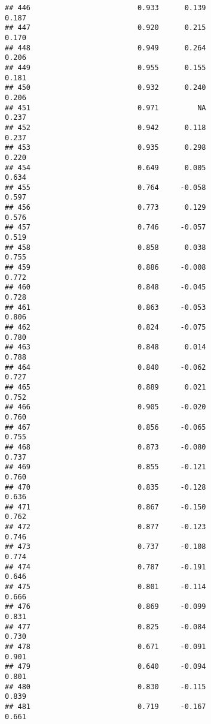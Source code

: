 \documentclass[
]{article}
\begin{document}
\begin{verbatim}
## 446                         0.933      0.139                     0.187
## 447                         0.920      0.215                     0.170
## 448                         0.949      0.264                     0.206
## 449                         0.955      0.155                     0.181
## 450                         0.932      0.240                     0.206
## 451                         0.971         NA                     0.237
## 452                         0.942      0.118                     0.237
## 453                         0.935      0.298                     0.220
## 454                         0.649      0.005                     0.634
## 455                         0.764     -0.058                     0.597
## 456                         0.773      0.129                     0.576
## 457                         0.746     -0.057                     0.519
## 458                         0.858      0.038                     0.755
## 459                         0.886     -0.008                     0.772
## 460                         0.848     -0.045                     0.728
## 461                         0.863     -0.053                     0.806
## 462                         0.824     -0.075                     0.780
## 463                         0.848      0.014                     0.788
## 464                         0.840     -0.062                     0.727
## 465                         0.889      0.021                     0.752
## 466                         0.905     -0.020                     0.760
## 467                         0.856     -0.065                     0.755
## 468                         0.873     -0.080                     0.737
## 469                         0.855     -0.121                     0.760
## 470                         0.835     -0.128                     0.636
## 471                         0.867     -0.150                     0.762
## 472                         0.877     -0.123                     0.746
## 473                         0.737     -0.108                     0.774
## 474                         0.787     -0.191                     0.646
## 475                         0.801     -0.114                     0.666
## 476                         0.869     -0.099                     0.831
## 477                         0.825     -0.084                     0.730
## 478                         0.671     -0.091                     0.901
## 479                         0.640     -0.094                     0.801
## 480                         0.830     -0.115                     0.839
## 481                         0.719     -0.167                     0.661

\end{verbatim}
\end{document}
